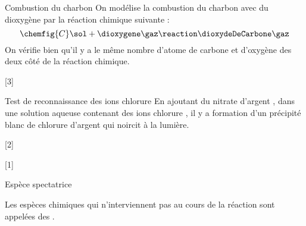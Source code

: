 \begin{doc}{Combustion du charbon}
  On modélise la combustion du charbon avec du dioxygène par la réaction chimique suivante :
  \begin{equation*}
    \chemfig{C}\sol + \dioxygene\gaz \reaction \dioxydeDeCarbone\gaz
  \end{equation*}
  On vérifie bien qu'il y a le même nombre d'atome de carbone et d'oxygène des deux côté de la réaction chimique.
\end{doc}


[3]



\begin{doc}{Test de reconnaissance des ions chlorure}
  En ajoutant du nitrate d'argent \sol, dans une solution aqueuse contenant des ions chlorure \chlorure, il y a formation d'un précipité blanc de chlorure d'argent \chlorureDArgent\sol qui noircit à la lumière.
\end{doc}

[2]

[1]

\vspace*{-4pt}
\begin{doc}{Espèce spectatrice}
  \begin{importants}
    Les espèces chimiques qui n'interviennent pas au cours de la réaction sont appelées des .
  \end{importants}
\end{doc}
